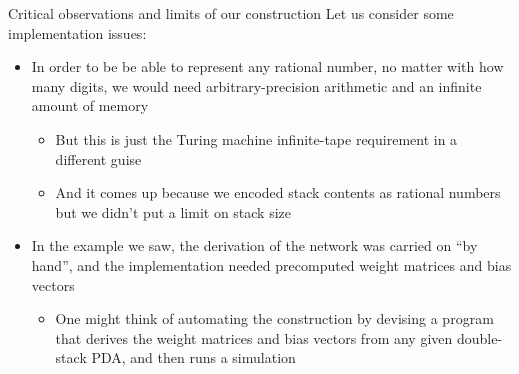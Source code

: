 \documentclass{beamer}
\begin{document}

\begin{frame}{Critical observations and limits of our construction}
	Let us consider some implementation issues:
	\begin{itemize}
		\pause
		\item In order to be be able to represent any rational number, no matter with how many digits, we would need \textcolor{unifiRed}{arbitrary}-\textcolor{unifiRed}{precision} arithmetic and an \textcolor{unifiRed}{infinite} amount of \textcolor{unifiRed}{memory}
		\begin{itemize}
			\pause
			\item But this is just the Turing machine infinite-tape requirement in a different guise
			\pause
			\item And it comes up because we encoded stack contents as rational numbers but we didn't put a limit on stack size
		\end{itemize}
		\pause
		\item In the example we saw, the derivation of the network was carried on \textquotedblleft \textcolor{unifiRed}{by hand}\textquotedblright, and the implementation needed \textcolor{unifiRed}{precomputed} weight matrices and bias vectors
		\begin{itemize}
			\pause
			\item One might think of automating the construction by devising a program that derives the weight matrices and bias vectors from any given double-stack PDA, and then runs a simulation
		\end{itemize}
	\end{itemize}
\end{frame}
\end{document}
